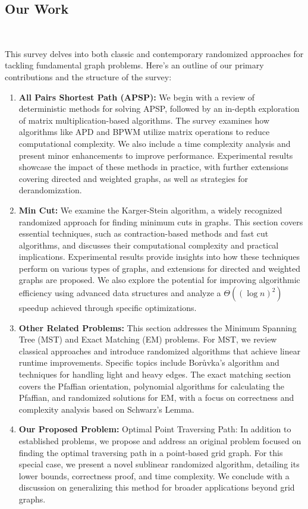 \documentclass[11pt]{article}
\theoremstyle{plain}
\begin{document}
\subsection{Our Work}\

This survey delves into both classic and contemporary randomized approaches for tackling fundamental graph problems. Here's an outline of our primary contributions and the structure of the survey:

\begin{enumerate}
    \item \textbf{All Pairs Shortest Path (APSP):} We begin with a review of deterministic methods for solving APSP, followed by an in-depth exploration of matrix multiplication-based algorithms. The survey examines how algorithms like APD and BPWM utilize matrix operations to reduce computational complexity. We also include a time complexity analysis and present minor enhancements to improve performance. Experimental results showcase the impact of these methods in practice, with further extensions covering directed and weighted graphs, as well as strategies for derandomization.
    \item \textbf{Min Cut:} We examine the Karger-Stein algorithm, a widely recognized randomized approach for finding minimum cuts in graphs. This section covers essential techniques, such as contraction-based methods and fast cut algorithms, and discusses their computational complexity and practical implications. Experimental results provide insights into how these techniques perform on various types of graphs, and extensions for directed and weighted graphs are proposed. We also explore the potential for improving algorithmic efficiency using advanced data structures and analyze a  $\Theta((\log n)^2)$  speedup achieved through specific optimizations.
    \item \textbf{Other Related Problems:} This section addresses the Minimum Spanning Tree (MST) and Exact Matching (EM) problems. For MST, we review classical approaches and introduce randomized algorithms that achieve linear runtime improvements. Specific topics include Borůvka's algorithm and techniques for handling light and heavy edges. The exact matching section covers the Pfaffian orientation, polynomial algorithms for calculating the Pfaffian, and randomized solutions for EM, with a focus on correctness and complexity analysis based on Schwarz's Lemma.
    \item \textbf{Our Proposed Problem:} Optimal Point Traversing Path: In addition to established problems, we propose and address an original problem focused on finding the optimal traversing path in a point-based grid graph. For this special case, we present a novel sublinear randomized algorithm, detailing its lower bounds, correctness proof, and time complexity. We conclude with a discussion on generalizing this method for broader applications beyond grid graphs.
\end{enumerate}
\end{document}
